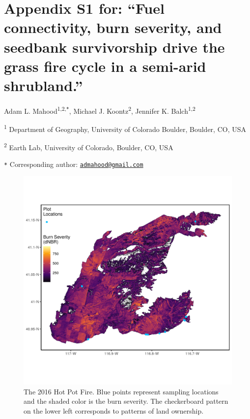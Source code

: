 \documentclass[
  12pt,
]{article}
\author{}
\date{\vspace{-2.5em}}
\begin{document}
\renewcommand{\thetable}{S\arabic{table}}      \setcounter{table}{0} \renewcommand{\thefigure}{S\arabic{figure}}

\hypertarget{appendix-s1-for-fuel-connectivity-burn-severity-and-seedbank-survivorship-drive-the-grass-fire-cycle-in-a-semi-arid-shrubland.}{%
\section{Appendix S1 for: ``Fuel connectivity, burn severity, and
seedbank survivorship drive the grass fire cycle in a semi-arid
shrubland.''}\label{appendix-s1-for-fuel-connectivity-burn-severity-and-seedbank-survivorship-drive-the-grass-fire-cycle-in-a-semi-arid-shrubland.}}

Adam L. Mahood\textsuperscript{1,2,\texttt{*}}, Michael J.
Koontz\textsuperscript{2}, Jennifer K. Balch\textsuperscript{1,2}

\small

\textsuperscript{1} Department of Geography, University of Colorado
Boulder, Boulder, CO, USA

\textsuperscript{2} Earth Lab, University of Colorado, Boulder, CO, USA

\texttt{*} Corresponding author:
\href{mailto:admahood@gmail.com}{\nolinkurl{admahood@gmail.com}}

\normalsize

\newpage

\begin{figure}
\centering
\includegraphics{images/map.png}
\caption{The 2016 Hot Pot Fire. Blue points represent sampling locations
and the shaded color is the burn severity. The checkerboard pattern on
the lower left corresponds to patterns of land ownership.}
\end{figure}
\end{document}
